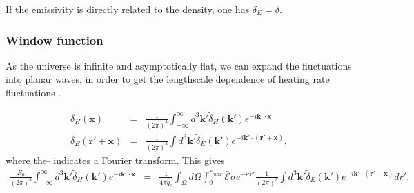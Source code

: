 \documentclass[onecolumn]{emulateapj}
\begin{document}
If  the emissivity is directly related to the density, one has $\delta_E=\delta$.

\subsubsection{Window function}
As the universe is infinite and asymptotically flat, we can expand the fluctuations into planar waves, in order to get the lengthscale dependence of heating rate fluctuations \citep{2004MNRAS.352..142B}.

\begin{eqnarray}
  \label{eq:FT_delta}
  \delta_H(\mathbf{x})&=&\frac{1}{(2\pi)^3}\int_{-\infty}^{\infty} d^3\mathbf{k'} \tilde{\delta}_H(\mathbf{k'}) e^{-i\mathbf{k'}\cdot\mathbf{x}}\\ \nonumber
  \delta_E(\mathbf{r}'+\mathbf{x})&=&\frac{1}{(2\pi)^3}\int d^3\mathbf{k'} \tilde{\delta}_E(\mathbf{k'}) e^{-i\mathbf{k'}\cdot(\mathbf{r'}+\mathbf{x})},
\end{eqnarray}
where the $\tilde{}$ indicates a Fourier transform.
This gives
\begin{eqnarray}
  \label{eq:heat_fluc_newt1}
\frac{E_0}{(2\pi)^3}\int_{-\infty}^{\infty} d^3\mathbf{k'} \tilde{\delta}_H(\mathbf{k'}) e^{-i\mathbf{k'}\cdot\mathbf{x}}&=&\frac{1}{4\pi\bar{\dot{q}}_0} \int_{\Omega}d\Omega\int_0^{r_{max}}   \bar{\mathcal{E}}\sigma  e^{-\kappa r'}  \frac{1}{(2\pi)^3}\int d^3\mathbf{k'} \tilde{\delta}_E(\mathbf{k'}) e^{-i\mathbf{k'}\cdot(\mathbf{r'}+\mathbf{x})} dr'.
\end{eqnarray}

\end{document}
